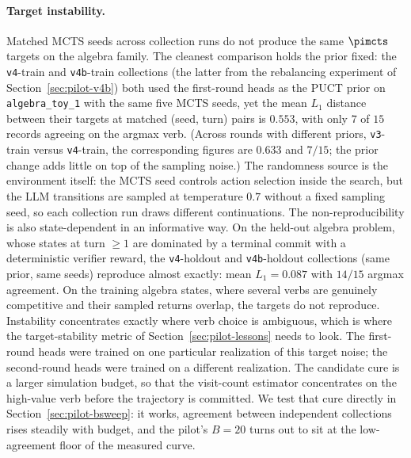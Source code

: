 \paragraph{Target instability.} Matched MCTS seeds across collection
runs do not produce the same $\pimcts$ targets on the algebra family.
The cleanest comparison holds the prior fixed: the \texttt{v4}-train
and \texttt{v4b}-train collections (the latter from the rebalancing
experiment of Section~\ref{sec:pilot-v4b}) both used the first-round
heads as the PUCT prior on \texttt{algebra\_toy\_1} with the same five
MCTS seeds, yet the mean $L_1$ distance between their targets at
matched (seed, turn) pairs is $0.553$, with only $7$ of $15$ records
agreeing on the argmax verb. (Across rounds with different priors,
\texttt{v3}-train versus \texttt{v4}-train, the corresponding figures
are $0.633$ and $7/15$; the prior change adds little on top of the
sampling noise.) The randomness source is the environment itself: the
MCTS seed controls action selection inside the search, but the LLM
transitions are sampled at temperature $0.7$ without a fixed sampling
seed, so each collection run draws different continuations. The
non-reproducibility is also state-dependent in an informative way.
On the held-out algebra problem, whose states at turn $\geq 1$ are
dominated by a terminal commit with a deterministic verifier reward,
the \texttt{v4}-holdout and \texttt{v4b}-holdout collections (same
prior, same seeds) reproduce almost exactly: mean $L_1 = 0.087$ with
$14/15$ argmax agreement. On the training algebra states, where
several verbs are genuinely competitive and their sampled returns
overlap, the targets do not reproduce. Instability concentrates
exactly where verb choice is ambiguous, which is where the
target-stability metric of Section~\ref{sec:pilot-lessons} needs to
look. The first-round heads were trained on one particular
realization of this target noise; the second-round heads were trained
on a different realization. The candidate cure is a larger simulation
budget, so that the visit-count estimator concentrates on the
high-value verb before the trajectory is committed. We test that cure
directly in Section~\ref{sec:pilot-bsweep}: it works, agreement between
independent collections rises steadily with budget, and the pilot's
$B = 20$ turns out to sit at the low-agreement floor of the measured
curve.

